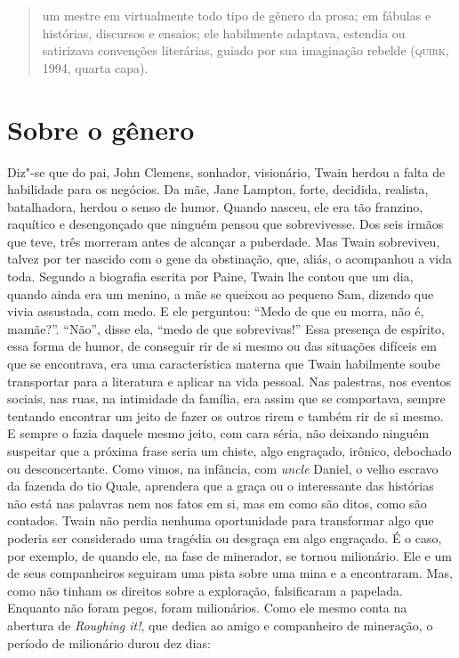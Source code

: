 \begin{quote}
um mestre em virtualmente todo
tipo de gênero da prosa; em fábulas e histórias, discursos e ensaios; ele
habilmente adaptava, estendia ou satirizava convenções literárias, guiado
por sua imaginação rebelde (\textsc{quirk}, 1994, quarta capa). 
\end{quote}


\section{Sobre o gênero}

Diz"-se que do pai, John Clemens, sonhador, visionário, Twain herdou a
falta de habilidade para os negócios. Da mãe, Jane Lampton, forte,
decidida, realista, batalhadora, herdou o senso de humor. Quando nasceu,
ele era tão franzino, raquítico e desengonçado que ninguém pensou que
sobrevivesse. Dos seis irmãos que teve, três morreram antes de alcançar a
puberdade. Mas Twain sobreviveu, talvez por ter nascido com o gene da
obstinação, que, aliás, o acompanhou a vida toda. Segundo a biografia
escrita por Paine, Twain lhe contou que um dia, quando ainda era um menino, a mãe
se queixou ao pequeno Sam, dizendo que vivia assustada, com medo. E ele
perguntou: ``Medo de que eu morra, não é, mamãe?''. ``Não'', disse ela,
``medo de que sobrevivas!'' Essa presença de espírito, essa forma
de humor, de conseguir rir de si mesmo ou das
situações difíceis em que se encontrava, era uma característica materna
que Twain habilmente soube transportar para a literatura e
aplicar na vida pessoal. Nas palestras, nos eventos sociais, nas ruas, na
intimidade da família, era assim que se comportava, sempre tentando
encontrar um jeito de fazer os outros rirem e também rir de si mesmo. E sempre o
fazia daquele mesmo jeito, com cara séria, não deixando ninguém
suspeitar que a próxima frase seria um chiste, algo
engraçado, irônico, debochado ou desconcertante. Como vimos, na infância,
com \textit{uncle} Daniel, o velho escravo da fazenda do tio Quale, aprendera que a
graça ou o interessante das histórias não está nas palavras nem nos fatos
em si, mas em como são ditos, como são contados. Twain não perdia nenhuma
oportunidade para transformar algo que poderia ser considerado uma
tragédia ou desgraça em algo engraçado. É o caso, por exemplo, de quando
ele, na fase de minerador, se tornou milionário. Ele e um de seus
companheiros seguiram uma pista sobre uma mina e a encontraram. Mas, como
não tinham os direitos sobre a exploração, falsificaram a papelada.
Enquanto não foram pegos, foram milionários. Como ele mesmo conta na
abertura de \textit{Roughing it!}, que dedica ao amigo e companheiro de
mineração, o período de milionário durou dez dias:

